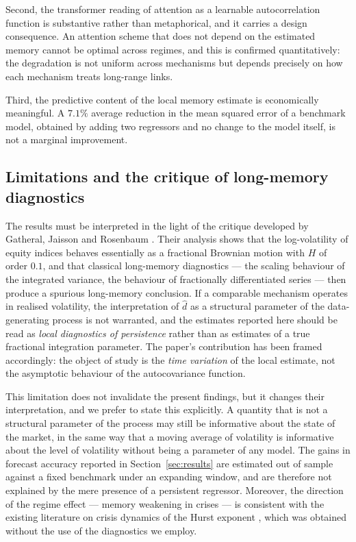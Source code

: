 \documentclass[journal]{IEEEtran}
\begin{document}
Second, the transformer reading of attention as a learnable autocorrelation function is
substantive rather than metaphorical, and it carries a design consequence. An attention scheme
that does not depend on the estimated memory cannot be optimal across regimes, and this is
confirmed quantitatively: the degradation is not uniform across mechanisms but depends precisely
on how each mechanism treats long-range links.

Third, the predictive content of the local memory estimate is economically meaningful. A $7.1\%$
average reduction in the mean squared error of a benchmark model, obtained by adding two
regressors and no change to the model itself, is not a marginal improvement.

\subsection{Limitations and the critique of long-memory diagnostics}\label{sec:limitations}

The results must be interpreted in the light of the critique developed by Gatheral, Jaisson and
Rosenbaum \cite{gatheral2018rough}. Their analysis shows that the log-volatility of equity indices
behaves essentially as a fractional Brownian motion with $H$ of order $0.1$, and that classical
long-memory diagnostics --- the scaling behaviour of the integrated variance, the behaviour of
fractionally differentiated series --- then produce a spurious long-memory conclusion. If a
comparable mechanism operates in realised volatility, the interpretation of $\hat d$ as a
structural parameter of the data-generating process is not warranted, and the estimates reported
here should be read as \emph{local diagnostics of persistence} rather than as estimates of a true
fractional integration parameter. The paper's contribution has been framed accordingly: the
object of study is the \emph{time variation} of the local estimate, not the asymptotic behaviour of
the autocovariance function.

This limitation does not invalidate the present findings, but it changes their interpretation, and
we prefer to state this explicitly. A quantity that is not a structural parameter of the process
may still be informative about the state of the market, in the same way that a moving average of
volatility is informative about the level of volatility without being a parameter of any model.
The gains in forecast accuracy reported in Section~\ref{sec:results} are estimated out of sample
against a fixed benchmark under an expanding window, and are therefore not explained by the mere
presence of a persistent regressor. Moreover, the direction of the regime effect --- memory
weakening in crises --- is consistent with the existing literature on crisis dynamics of the Hurst
exponent \cite{vogl2023hurst,choi2025three}, which was obtained without the use of the
diagnostics we employ.
\end{document}

